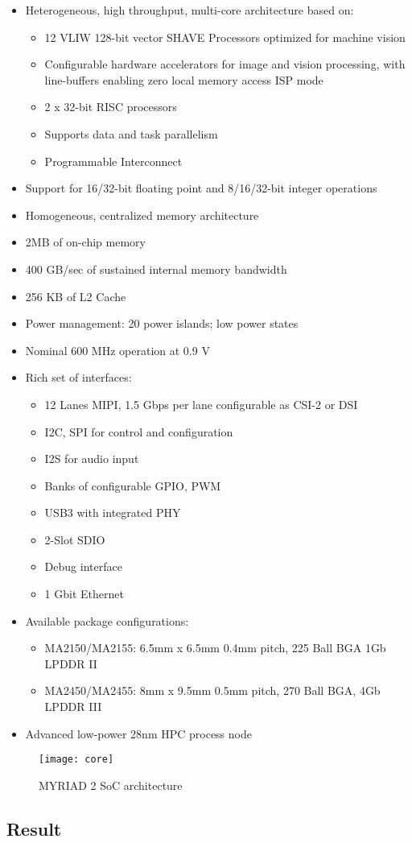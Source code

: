 \begin{itemize}
	\item Heterogeneous, high throughput, multi-core architecture based on:
	\begin{itemize}
		\item  12 VLIW 128-bit vector SHAVE Processors optimized for machine vision
		\item  Configurable hardware accelerators for image and vision processing, with line-buffers enabling zero local memory access ISP mode
		\item 2 x 32-bit RISC processors 
		\item Supports data and task parallelism 
		\item Programmable Interconnect
		\end{itemize}
		\item  Support for 16/32-bit floating point and 8/16/32-bit integer operations
		\item  Homogeneous, centralized memory architecture
		\item 2MB of on-chip memory
		\item  400 GB/sec of sustained internal memory bandwidth
		\item  256 KB of L2 Cache
		\item  Power management: 20 power islands; low power states
		\item  Nominal 600 MHz operation at 0.9 V
		\item  Rich set of interfaces:
		\begin{itemize}
			\item  12 Lanes MIPI, 1.5 Gbps per lane configurable as CSI-2 or DSI
			\item  I2C, SPI for control and configuration
			\item  I2S for audio input
			\item  Banks of configurable GPIO, PWM
			\item  USB3 with integrated PHY
			\item  2-Slot SDIO
			\item  Debug interface
			\item  1 Gbit Ethernet
		\end{itemize}
		\item  Available package configurations:
		\begin{itemize}
			\item  MA2150/MA2155: 6.5mm x 6.5mm 0.4mm pitch, 225 Ball BGA 1Gb LPDDR II
			\item  MA2450/MA2455: 8mm x 9.5mm 0.5mm pitch, 270 Ball BGA, 4Gb LPDDR III
		\end{itemize}
		\item  Advanced low-power 28nm HPC process node
\end{itemize}
%
\begin{figure}[htb]
\centering
\texttt{[image: core]}
\caption{MYRIAD 2 SoC architecture}
\label{fig:architecture}
\end{figure}
%
\subsection{Result}
\label{subsection:result}